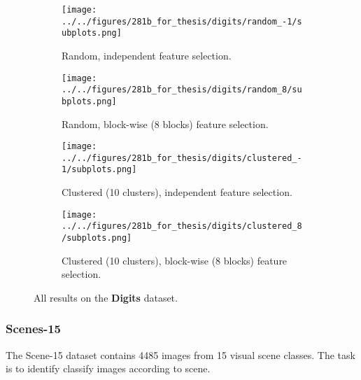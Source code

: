 \begin{figure}[ht]
    \centering
    \begin{subfigure}[b]{.9\textwidth}
        \centering
        \texttt{[image: ../../figures/281b\_for\_thesis/digits/random\_-1/subplots.png]}
        \caption{Random, independent feature selection.\vspace{.2cm}}
    \end{subfigure}
    \begin{subfigure}[b]{.9\textwidth}
        \centering
        \texttt{[image: ../../figures/281b\_for\_thesis/digits/random\_8/subplots.png]}
        \caption{Random, block-wise (8 blocks) feature selection.\vspace{.2cm}}
    \end{subfigure}
    \begin{subfigure}[b]{\textwidth}
        \centering
        \texttt{[image: ../../figures/281b\_for\_thesis/digits/clustered\_-1/subplots.png]}
        \caption{Clustered (10 clusters), independent feature selection.\vspace{.2cm}}
    \end{subfigure}
    \begin{subfigure}[b]{\textwidth}
        \centering
        \texttt{[image: ../../figures/281b\_for\_thesis/digits/clustered\_8/subplots.png]}
        \caption{Clustered (10 clusters), block-wise (8 blocks) feature selection.\vspace{.2cm}}
    \end{subfigure}
    \caption{All results on the \textbf{Digits} dataset.}
    \label{fig:digits}
\end{figure}

\subsubsection{Scenes-15}
The Scene-15 dataset \cite{Lazebnik-CVPR-2006} contains 4485 images from 15 visual scene classes.
The task is to identify classify images according to scene.

